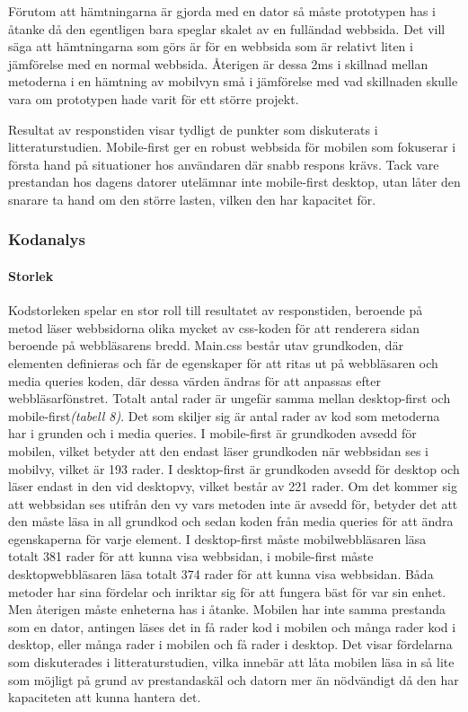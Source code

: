 \documentclass[11pt]{article}
\begin{document}
Förutom att hämtningarna är gjorda med en dator så måste prototypen has i åtanke då den egentligen bara speglar skalet av en fulländad webbsida. Det vill säga att hämtningarna som görs är för en webbsida som är relativt liten i jämförelse med en normal webbsida. Återigen är dessa 2ms i skillnad mellan metoderna i en hämtning av mobilvyn små i jämförelse med vad skillnaden skulle vara om prototypen hade varit för ett större projekt.

Resultat av responstiden visar tydligt de punkter som diskuterats i litteraturstudien. Mobile-first ger en robust webbsida för mobilen som fokuserar i första hand på situationer hos användaren där snabb respons krävs. Tack vare prestandan hos dagens datorer utelämnar inte mobile-first desktop, utan låter den snarare ta hand om den större lasten, vilken den har kapacitet för.

\subsubsection{Kodanalys}
\paragraph{Storlek}\mbox{}

Kodstorleken spelar en stor roll till resultatet av responstiden, beroende på metod läser webbsidorna olika mycket av css-koden för att renderera sidan beroende på webbläsarens bredd. Main.css består utav grundkoden, där elementen definieras och får de egenskaper för att ritas ut på webbläsaren och media queries koden, där dessa värden ändras för att anpassas efter webbläsarfönstret. Totalt antal rader är ungefär samma mellan desktop-first och mobile-first\textit{(tabell 8)}. Det som skiljer sig är antal rader av kod som metoderna har i grunden och i media queries. I mobile-first är grundkoden avsedd för mobilen, vilket betyder att den endast läser grundkoden när webbsidan ses i mobilvy, vilket är 193 rader. I desktop-first är grundkoden avsedd för desktop och läser endast in den vid desktopvy, vilket består av 221 rader. Om det kommer sig att webbsidan ses utifrån den vy vars metoden inte är avsedd för, betyder det att den måste läsa in all grundkod och sedan koden från media queries för att ändra egenskaperna för varje element. I desktop-first måste mobilwebbläsaren läsa totalt 381 rader för att kunna visa webbsidan, i mobile-first måste desktopwebbläsaren läsa totalt 374 rader för att kunna visa webbsidan. Båda metoder har sina fördelar och inriktar sig för att fungera bäst för var sin enhet. Men återigen måste enheterna has i åtanke. Mobilen har inte samma prestanda som en dator, antingen läses det in få rader kod i mobilen och många rader kod i desktop, eller många rader i mobilen och få rader i desktop. Det visar fördelarna som diskuterades i litteraturstudien, vilka innebär att låta mobilen läsa in så lite som möjligt på grund av prestandaskäl och datorn mer än nödvändigt då den har kapaciteten att kunna hantera det. 
\end{document}
